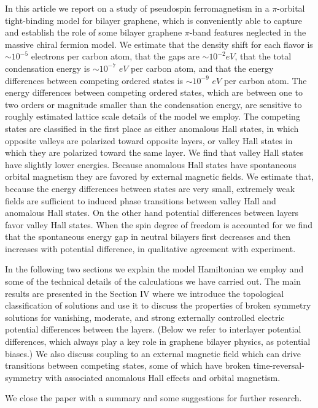 \documentclass[twocolumn,prb,showpacs,preprintnumbers,amsmath,amssymb]{revtex4}
\begin{document}
In this article we report on a study of pseudospin ferromagnetism
in a $\pi$-orbital tight-binding model for bilayer graphene, which is conveniently able to 
capture and establish the role of some bilayer graphene $\pi$-band features neglected in the massive chiral fermion model. 
We estimate that the density shift for each flavor is $\sim 10^{-5}$ electrons per carbon atom,
that the gaps are $\sim 10^{-2} eV$, that the total condensation energy  
is $ \sim 10^{-7} \,\, eV$ per carbon atom, and that the energy differences between competing
ordered states is $\sim 10^{-9} \,\,eV$ per carbon atom. 
The energy differences between competing ordered states,
which are between one to two orders or magnitude 
smaller than the condensation energy, are sensitive to 
roughly estimated lattice scale details
of the model we employ.
The competing states are classified in the first place as either anomalous Hall states, in which opposite valleys are polarized toward opposite layers, or valley Hall states in which they are polarized toward the same layer.  
We find that valley Hall states have slightly lower energies.  Because anomalous Hall states have spontaneous orbital magnetism they are favored by external magnetic fields.  We estimate that, because the energy differences between states are very small, extremely weak fields are sufficient to induced phase transitions between valley Hall and anomalous Hall states.  On the other hand potential differences between layers favor valley Hall states.  When the spin degree of freedom is accounted for we find that the spontaneous energy gap in neutral bilayers first decreases and then increases with potential difference, in qualitative agreement with experiment.

In the following two sections we explain the model Hamiltonian we employ and some of the technical 
details of the calculations we have carried out. 
The main results are presented in the Section IV where we introduce the topological 
classification of solutions and use it to discuss the properties of broken symmetry solutions
for vanishing, moderate, and strong externally controlled electric potential differences between the layers.
(Below we refer to interlayer potential differences, which always play a key role in 
graphene bilayer physics, as potential biases.)
We also discuss coupling to an external magnetic field which can drive transitions 
between competing states, some of which have broken time-reversal-symmetry with 
associated anomalous Hall effects and orbital magnetism.

We close the paper with a summary and some suggestions for further research.
\end{document}

